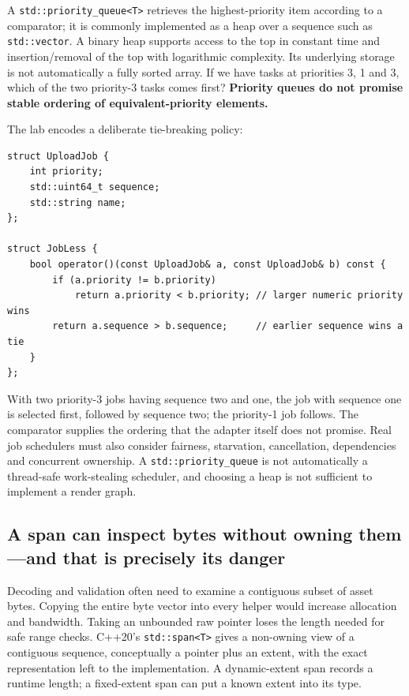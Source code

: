 A \texttt{std::priority\_queue\textless{}T\textgreater{}} retrieves the highest-priority item according to a comparator; it is commonly implemented as a heap over a sequence such as \texttt{std::vector}. A binary heap supports access to the top in constant time and insertion/removal of the top with logarithmic complexity. Its underlying storage is not automatically a fully sorted array. If we have tasks at priorities 3, 1 and 3, which of the two priority-3 tasks comes first? \textbf{Priority queues do not promise stable ordering of equivalent-priority elements.}

The lab encodes a deliberate tie-breaking policy:

\begin{verbatim}
struct UploadJob {
    int priority;
    std::uint64_t sequence;
    std::string name;
};

struct JobLess {
    bool operator()(const UploadJob& a, const UploadJob& b) const {
        if (a.priority != b.priority)
            return a.priority < b.priority; // larger numeric priority wins
        return a.sequence > b.sequence;     // earlier sequence wins a tie
    }
};
\end{verbatim}

With two priority-3 jobs having sequence two and one, the job with sequence one is selected first, followed by sequence two; the priority-1 job follows. The comparator supplies the ordering that the adapter itself does not promise. Real job schedulers must also consider fairness, starvation, cancellation, dependencies and concurrent ownership. A \texttt{std::priority\_queue} is not automatically a thread-safe work-stealing scheduler, and choosing a heap is not sufficient to implement a render graph.

\subsection{A span can inspect bytes without owning them---and that is precisely its danger}\label{05-engine-i-ch005-a-span-can-inspect-bytes-without-owning-themand-that-is-precisely-its-danger}

Decoding and validation often need to examine a contiguous subset of asset bytes. Copying the entire byte vector into every helper would increase allocation and bandwidth. Taking an unbounded raw pointer loses the length needed for safe range checks. C++20's \texttt{std::span\textless{}T\textgreater{}} gives a non-owning view of a contiguous sequence, conceptually a pointer plus an extent, with the exact representation left to the implementation. A dynamic-extent span records a runtime length; a fixed-extent span can put a known extent into its type.

